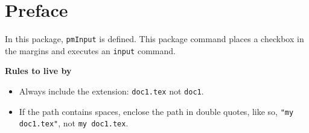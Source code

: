 \documentclass{book}
\def\cs#1{\texttt{\eqbs#1}}
\begin{document}
\chapter*{Preface}

In this package, \cs{pmInput} is defined. This package command places a checkbox
in the margins and executes an \cs{input} command.

\medskip\noindent\textbf{Rules to live by}\begin{itemize}
  \item Always include the extension: \texttt{doc1.tex} not \texttt{doc1}.
  \item If the path contains spaces, enclose the path in double quotes, like so,
  \texttt{"my doc1.tex"}, not \texttt{my doc1.tex}.
\end{itemize}





\medskip\noindent
\displayChoices{}{11bp}\cgBdry[1em]\clrChoices{}{11bp}
\end{document}

